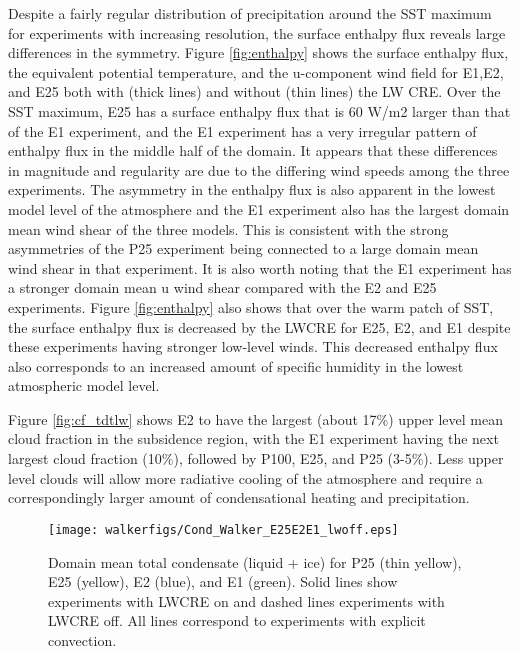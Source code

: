 \documentclass[draft]{agujournal2019}
\begin{document}
Despite a fairly regular distribution of precipitation around the SST maximum for experiments with increasing resolution, the 
surface enthalpy flux reveals large differences in the symmetry.   Figure \ref{fig:enthalpy} shows the surface enthalpy flux, 
the equivalent potential temperature, and the u-component wind field for E1,E2, and E25 both with (thick lines) and 
without (thin lines) the LW CRE.  
Over the SST maximum, E25 has a surface enthalpy flux that is 
60 W/m2 larger than that of the E1 experiment, and the E1 experiment has a very irregular pattern of enthalpy flux in the middle
half of the domain.  It appears that these differences in magnitude and regularity are due to the differing wind speeds among 
the three experiments.  The asymmetry in the enthalpy flux is also apparent in the lowest model level of the atmosphere
and the E1 experiment also has the largest domain mean wind shear of the three models.  This is consistent with the 
strong asymmetries of the P25 experiment being connected to a large domain mean wind shear in that experiment.  
It is also worth noting that the E1 experiment has a stronger domain mean u wind shear compared 
with the E2 and E25 experiments.  Figure \ref{fig:enthalpy} also shows that over the warm patch of SST, the surface 
enthalpy flux is decreased by the LWCRE for E25, E2, and E1 despite these experiments having stronger low-level winds.  
This decreased enthalpy flux also corresponds to an increased amount of specific humidity in the lowest atmospheric 
model level.        



Figure \ref{fig:cf_tdtlw} shows E2 to have the largest (about 17\%) upper level mean cloud
fraction in the subsidence region, with the E1 experiment having the next largest cloud fraction (10\%), followed by 
P100, E25, and P25 (3-5\%).   Less upper level clouds will allow more radiative cooling of the atmosphere and 
require a correspondingly larger amount of condensational heating and precipitation.    


\begin{figure}
  \centering
       \texttt{[image: walkerfigs/Cond\_Walker\_E25E2E1\_lwoff.eps]}
          \caption{Domain mean total condensate (liquid + ice) for P25 (thin yellow), E25 (yellow), 
          E2 (blue), and E1 (green).  Solid lines show experiments with LWCRE on
          and dashed lines experiments with LWCRE off.  All lines correspond to experiments with explicit 
          convection.}
  \label{fig:TotCond}
\end{figure}
\end{document}
